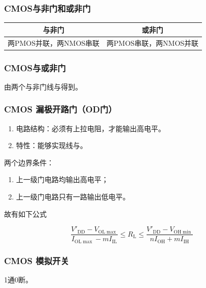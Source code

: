 \documentclass[UTF8,fontset=fandol,zihao=5]{ctexart}
\begin{document}
\subsubsection{CMOS与非门和或非门}

\begin{table}[htbp]
  \centering
  \begin{tabular}{cc}
    \toprule
    与非门 & 或非门 \\
    \midrule
    两PMOS并联，两NMOS串联 & 两PMOS串联，两NMOS并联 \\
    \bottomrule
  \end{tabular}
\end{table}

\subsubsection{CMOS与或非门}

由两个与非门线与得到。

\subsubsection{CMOS 漏极开路门（OD门）}

\begin{enumerate}
  \item 电路结构：必须有上拉电阻，才能输出高电平。
  \item 特性：能够实现线与。
\end{enumerate}

\begin{methodbox}[如何计算上拉电阻范围]
  两个边界条件：
  \begin{enumerate}
    \item 上一级门电路均输出高电平；
    \item 上一级门电路只有一路输出低电平。
  \end{enumerate}
\end{methodbox}

故有如下公式

\[
\frac{V'_{\mathrm{DD}}-V_{\mathrm{OL}\max}}{I_{\mathrm{OL}\max}-mI_{\mathrm{IL}}}
\leq R_{\mathrm{L}} \leq
\frac{V'_{\mathrm{DD}}-V_{\mathrm{OH}\min}}{nI_{\mathrm{OH}}+mI_{\mathrm{IH}}}
\]

\subsubsection{CMOS 模拟开关}

1通0断。
\end{document}
